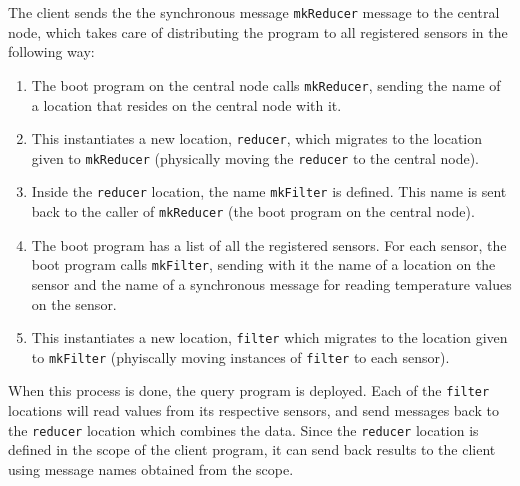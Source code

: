 The client sends the the synchronous message \verb!mkReducer! message
to the central node, which takes care of distributing the program to all
registered sensors in the following way:
\begin{enumerate}
 \item
   The boot program on the central node calls \verb!mkReducer!, sending the name
   of a location that resides on the central node with it.
 \item
   This instantiates a new location, \verb!reducer!, which migrates to the
   location given to \verb!mkReducer! (physically moving the \verb!reducer! to
   the central node).
 \item
   Inside the \verb!reducer! location, the name \verb!mkFilter! is defined.
   This name is sent back to the caller of \verb!mkReducer! (the boot program on
   the central node).
 \item
   The boot program has a list of all the registered sensors. For each sensor,
   the boot program calls \verb!mkFilter!, sending with it the name of a
   location on the sensor and the name of a synchronous message for reading
   temperature values on the sensor.
 \item
   This instantiates a new location, \verb!filter! which migrates to the
   location given to \verb!mkFilter! (phyiscally moving instances of
   \verb!filter! to each sensor).
\end{enumerate}

When this process is done, the query program is deployed. Each of the
\verb!filter! locations will read values from its respective sensors, and send
messages back to the \verb!reducer! location which combines the data. Since
the \verb!reducer! location is defined in the scope of the client program,
it can send back results to the client using message names obtained from the
scope.
